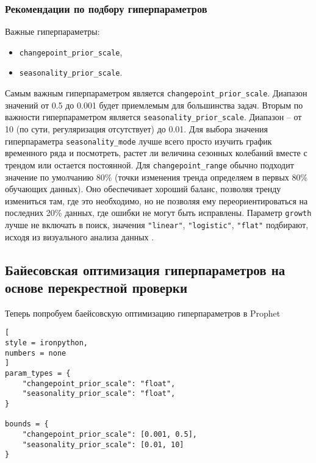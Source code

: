 \documentclass[%
	11pt,
	a4paper,
	utf8,
		]{article}
\begin{document}
\subsubsection{Рекомендации по подбору гиперпараметров}

Важные гиперпараметры:
\begin{itemize}
	\item \verb|changepoint_prior_scale|,
	
	\item \verb|seasonality_prior_scale|.
\end{itemize}

Самым важным гиперпараметром является \verb|changepoint_prior_scale|. Диапазон значений от 0.5 до 0.001 будет приемлемым для большинства задач. Вторым по важности гиперпараметром является \verb|seasonality_prior_scale|. Диапазон -- от 10 (по сути, регуляризация отсутствует) до 0.01. Для выбора значения гиперпараметра \verb|seasonality_mode| лучше всего просто изучить график временного ряда и посмотреть, растет ли величина сезонных колебаний вместе с трендом или остается постоянной.  Для \verb|changepoint_range| обычно подходит значение по умолчанию 80\% (точки изменения тренда определяем в первых 80\% обучающих данных). Оно обеспечивает хороший баланс, позволяя тренду измениться там, где это необходимо, но не позволяя ему переориентироваться на последних 20\% данных, где ошибки не могут быть исправлены. Параметр \verb|growth| лучше не включать в поиск, значения \verb|"linear"|, \verb|"logistic"|, \verb|"flat"| подбирают, исходя из визуального анализа данных \cite[]{gruzdev:time-series-2022}.

\subsection{Байесовская оптимизация гиперпараметров на основе перекрестной проверки}

Теперь попробуем баейсовскую оптимизацию гиперпараметров в Prophet
\begin{lstlisting}[
style = ironpython,
numbers = none
]
param_types = {
    "changepoint_prior_scale": "float",
    "seasonality_prior_scale": "float",
}

bounds = {
    "changepoint_prior_scale": [0.001, 0.5],
    "seasonality_prior_scale": [0.01, 10]
}
\end{lstlisting}
\end{document}
